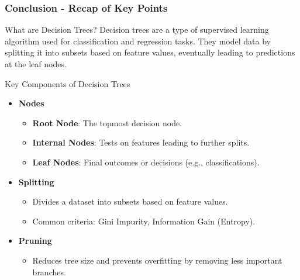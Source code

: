 \documentclass[aspectratio=169]{beamer}
\begin{document}
\begin{frame}[fragile]
    \frametitle{Conclusion - Recap of Key Points}
    
    \begin{block}{What are Decision Trees?}
        Decision trees are a type of supervised learning algorithm used for classification and regression tasks. They model data by splitting it into subsets based on feature values, eventually leading to predictions at the leaf nodes.
    \end{block}
    
    \begin{block}{Key Components of Decision Trees}
        \begin{itemize}
            \item \textbf{Nodes}
                \begin{itemize}
                    \item \textbf{Root Node}: The topmost decision node.
                    \item \textbf{Internal Nodes}: Tests on features leading to further splits.
                    \item \textbf{Leaf Nodes}: Final outcomes or decisions (e.g., classifications).
                \end{itemize}
            \item \textbf{Splitting}
                \begin{itemize}
                    \item Divides a dataset into subsets based on feature values.
                    \item Common criteria: Gini Impurity, Information Gain (Entropy).
                \end{itemize}
            \item \textbf{Pruning}
                \begin{itemize}
                    \item Reduces tree size and prevents overfitting by removing less important branches.
                \end{itemize}
        \end{itemize}
    \end{block}
\end{frame}
\end{document}
